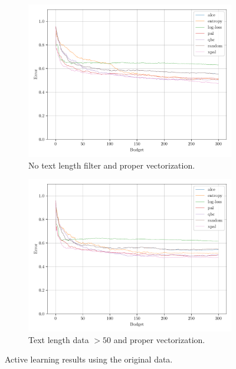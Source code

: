 \begin{figure}[ht]
    \centering
    \begin{subfigure}{0.49\textwidth}
        \includegraphics[width=\textwidth]{../img/plot_text_data_original_proper_vectorizer_test_results.pdf}
        \caption{No text length filter and proper vectorization.}
        \label{fig:probal_original_proper_vect}
    \end{subfigure}
    \hfill
    \begin{subfigure}{0.49\textwidth}
        \includegraphics[width=\textwidth]{../img/plot_text_data_original_proper_vectorizer_50_st_filter_test_results.pdf}
        \caption{Text length data $>50$ and proper vectorization.}
        \label{fig:probal_original_proper_vect_50_st_filter}
    \end{subfigure}
    \caption{Active learning results using the original data.}
\end{figure}


